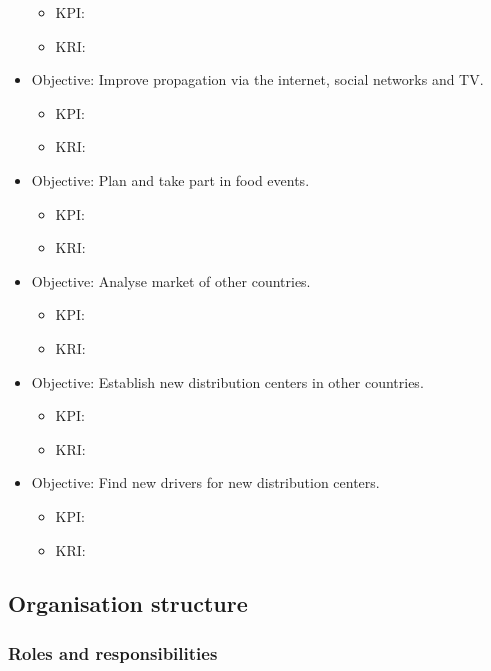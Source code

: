 \documentclass[11pt,a4paper]{article}
\begin{document}
\begin{itemize}
    \begin{itemize}
        \item KPI: 
        \item KRI: 
    \end{itemize}
    \item Objective: Improve propagation via the internet, social networks and TV.
    \begin{itemize}
        \item KPI: 
        \item KRI: 
    \end{itemize}
    \item Objective: Plan and take part in food events.
    \begin{itemize}
        \item KPI: 
        \item KRI: 
    \end{itemize}
    \item Objective: Analyse market of other countries.
    \begin{itemize}
        \item KPI: 
        \item KRI: 
    \end{itemize}
    \item Objective: Establish new distribution centers in other countries.
    \begin{itemize}
        \item KPI: 
        \item KRI: 
    \end{itemize}
    \item Objective: Find new drivers for new distribution centers.
    \begin{itemize}
        \item KPI: 
        \item KRI: 
    \end{itemize}
\end{itemize}

\subsection{Organisation structure}
\subsubsection{Roles and responsibilities}
\end{document}
